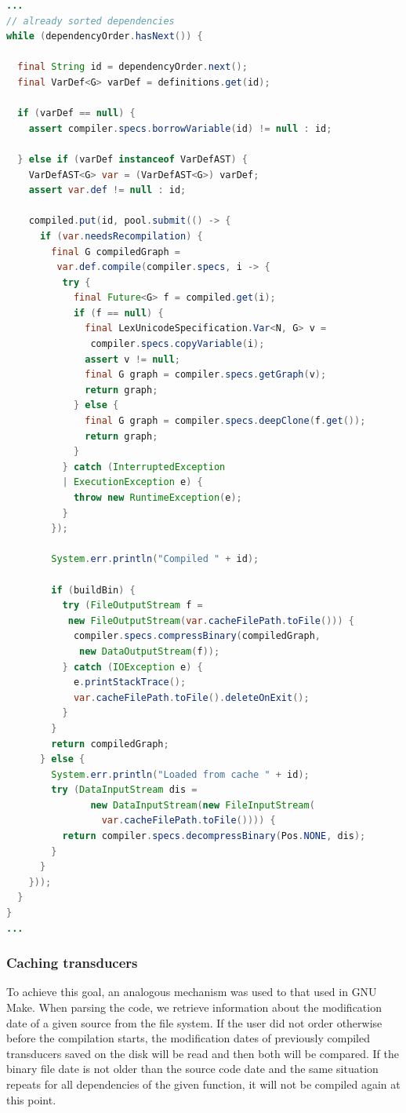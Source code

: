 \begin{lstlisting}[language=Java]
...
// already sorted dependencies
while (dependencyOrder.hasNext()) {

  final String id = dependencyOrder.next();
  final VarDef<G> varDef = definitions.get(id);

  if (varDef == null) {
    assert compiler.specs.borrowVariable(id) != null : id;

  } else if (varDef instanceof VarDefAST) {
    VarDefAST<G> var = (VarDefAST<G>) varDef;
    assert var.def != null : id;

    compiled.put(id, pool.submit(() -> {
      if (var.needsRecompilation) {
        final G compiledGraph =
         var.def.compile(compiler.specs, i -> {
          try {
            final Future<G> f = compiled.get(i);
            if (f == null) {
              final LexUnicodeSpecification.Var<N, G> v =
               compiler.specs.copyVariable(i);
              assert v != null;
              final G graph = compiler.specs.getGraph(v);
              return graph;
            } else {
              final G graph = compiler.specs.deepClone(f.get());
              return graph;
            }
          } catch (InterruptedException 
          | ExecutionException e) {
            throw new RuntimeException(e);
          }
        });

        System.err.println("Compiled " + id);

        if (buildBin) {
          try (FileOutputStream f =
           new FileOutputStream(var.cacheFilePath.toFile())) {
            compiler.specs.compressBinary(compiledGraph,
             new DataOutputStream(f));
          } catch (IOException e) {
            e.printStackTrace();
            var.cacheFilePath.toFile().deleteOnExit();
          }
        }
        return compiledGraph;
      } else {
        System.err.println("Loaded from cache " + id);
        try (DataInputStream dis =
               new DataInputStream(new FileInputStream(
                 var.cacheFilePath.toFile()))) {
          return compiler.specs.decompressBinary(Pos.NONE, dis);
        }
      }
    }));
  }
}
...
\end{lstlisting}

\hypertarget{caching-transducers}{%
\subsubsection{Caching transducers}\label{caching-transducers}}

To achieve this goal, an analogous mechanism was used to that used in
GNU Make. When parsing the code, we retrieve information about the
modification date of a given source from the file system. If the user
did not order otherwise before the compilation starts, the modification
dates of previously compiled transducers saved on the disk will be read
and then both will be compared. If the binary file date is not
older than the source code date and the same situation repeats for all
dependencies of the given function, it will not be compiled again at
this point.

